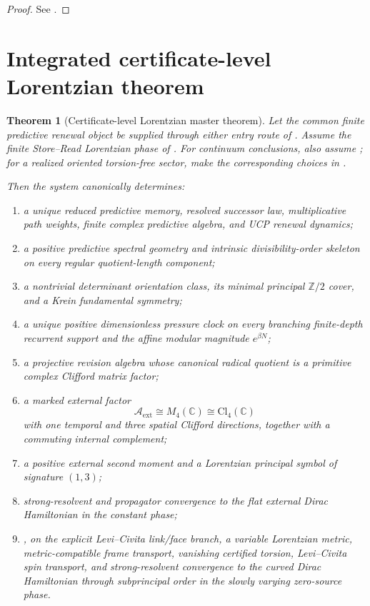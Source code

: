 \documentclass[11pt]{article}
\newtheorem{theorem}{Theorem}[section]
\theoremstyle{definition}
\theoremstyle{remark}
\newcommand{\C}{\mathbb C}
\newcommand{\Cl}{\mathrm{Cl}}
\newcommand{\Ztwo}{\mathbb Z/2}
\newcommand{\A}{\mathcal A}
\newcommand{\ext}{\mathrm{ext}}
\begin{document}
\begin{proof}
See .
\end{proof}

\section{Integrated certificate-level Lorentzian theorem}

\begin{theorem}[Certificate-level Lorentzian master theorem]
\label{thm:master}
Let the common finite predictive renewal object be supplied through either
entry route of .  Assume the finite Store--Read
Lorentzian phase of .  For continuum conclusions, also
assume ; for a realized oriented torsion-free sector,
make the corresponding choices in .

Then the system canonically determines:
\begin{enumerate}[label=\textup{(\Roman*)},leftmargin=3em]
\item a unique reduced predictive memory, resolved successor law,
      multiplicative path weights, finite complex predictive algebra, and UCP
      renewal dynamics;
\item a positive predictive spectral geometry and intrinsic divisibility-order
      skeleton on every regular quotient-length component;
\item a nontrivial determinant orientation class, its minimal principal
      $\Ztwo$ cover, and a Krein fundamental symmetry;
\item a unique positive dimensionless pressure clock on every branching
      finite-depth recurrent support and the affine modular magnitude
      $e^{\beta N}$;
\item a projective revision algebra whose canonical radical quotient is a
      primitive complex Clifford matrix factor;
\item a marked external factor
      \[
        \A_{\ext}\cong M_4(\C)\cong\Cl_4(\C)
      \]
      with one temporal and three spatial Clifford directions, together with a
      commuting internal complement;
\item a positive external second moment and a Lorentzian principal symbol of
      signature $(1,3)$;
\item strong-resolvent and propagator convergence to the flat external Dirac
      Hamiltonian in the constant phase;
\item, on the explicit Levi--Civita link/face branch, a variable Lorentzian
      metric, metric-compatible frame transport, vanishing certified torsion,
      Levi--Civita spin transport, and strong-resolvent convergence to the
      curved Dirac Hamiltonian through subprincipal order in the slowly varying
      zero-source phase.
\end{enumerate}


\end{theorem}
\end{document}
